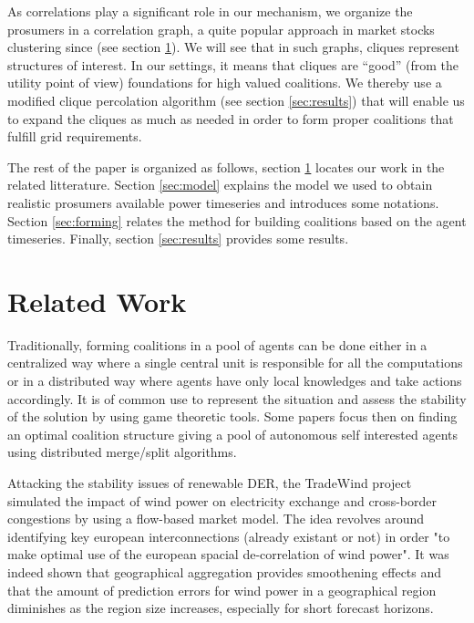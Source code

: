 \documentclass[conference]{IEEEtran}
\begin{document}
As correlations play a significant role in our mechanism, we organize the prosumers in a correlation graph, a quite popular approach in market stocks clustering since \cite{Mantegna1999} (see section \ref{sec:related}). We will see that in such graphs, cliques represent structures of interest. In our settings, it means that cliques are “good” (from the utility point of view) foundations for high valued coalitions. We thereby use a modified clique percolation algorithm (see section \ref{sec:results}) that will enable us to expand the cliques as much as needed in order to form proper coalitions that fulfill grid requirements.

The rest of the paper is organized as follows, section \ref{sec:related} locates our work in the related litterature. Section \ref{sec:model} explains the model we used to obtain realistic prosumers available power timeseries and introduces some notations. Section \ref{sec:forming} relates the method for building coalitions based on the agent timeseries. Finally, section \ref{sec:results} provides some results.


\section{Related Work}
\label{sec:related}

Traditionally, forming coalitions in a pool of agents can be done either in a centralized way where a single central unit is responsible for all the computations or in a distributed way where agents have only local knowledges and take actions accordingly. It is of common use to represent the situation and assess the stability of the solution by using game theoretic tools. Some papers \cite{Saad2009} \cite{Luan2014} focus then on finding an optimal coalition structure giving a pool of autonomous self interested agents using distributed merge/split algorithms.

Attacking the stability issues of renewable DER, the TradeWind project \cite{Europe} simulated the impact of wind power on electricity exchange and cross-border congestions by using a flow-based market model. The idea revolves around identifying key european interconnections (already existant or not) in order "to make optimal use of the european spacial de-correlation of wind power". It was indeed shown that geographical aggregation provides smoothening effects and that the amount of prediction errors for wind power in a geographical region diminishes as the region size increases, especially for short forecast horizons.
\end{document}
